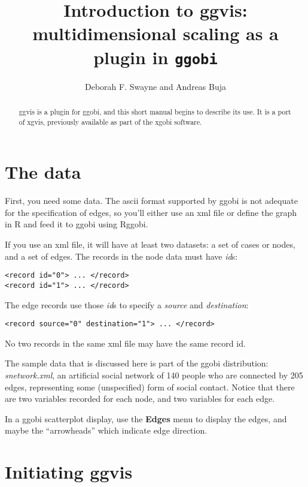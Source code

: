 \documentclass[11pt]{article}
\def\file#1{\textsl{#1}}
\def\XMLAttribute#1{\textsl{#1}}
\begin{document}
\title{Introduction to ggvis: multidimensional scaling as a plugin in {\tt ggobi}}
\author{Deborah F. Swayne and Andreas Buja}
\maketitle

\begin{abstract}
ggvis is a plugin for ggobi, and this short manual begins
to describe its use.  It is a port of xgvis,  previously
available as part of the xgobi software.
\end{abstract}

\section{The data}

First, you need some data.  The ascii format supported by ggobi is not
adequate for the specification of edges, so you'll either use an xml file
or define the graph in R and feed it to ggobi using Rggobi.

If you use an xml file, it will have at least two datasets: a set of
cases or nodes, and a set of edges.  The records in the node data must
have \XMLAttribute{id}s:

\begin{verbatim}
<record id="0"> ... </record>
<record id="1"> ... </record>
\end{verbatim}

The edge records use those \XMLAttribute{id}s to specify a
\XMLAttribute{source} and \XMLAttribute{destination}:

\begin{verbatim}
<record source="0" destination="1"> ... </record>
\end{verbatim}

No two records in the same xml file may have the same record id.

The sample data that is discussed here is part of the ggobi distribution:
\file{snetwork.xml}, an artificial social network of 140 people who are
connected by 205 edges, representing some (unspecified) form of social
contact.  Notice that there are two variables recorded for each node,
and two variables for each edge.

In a ggobi scatterplot display, use the {\bf Edges} menu to
display the edges, and maybe the ``arrowheads'' which indicate
edge direction.

\section{Initiating ggvis}
\end{document}
